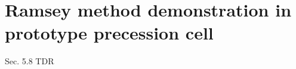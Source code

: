
\chapter{Ramsey method demonstration in prototype precession cell}\label{chap:lanl_ramsey_demonstration}


Sec. 5.8 TDR
